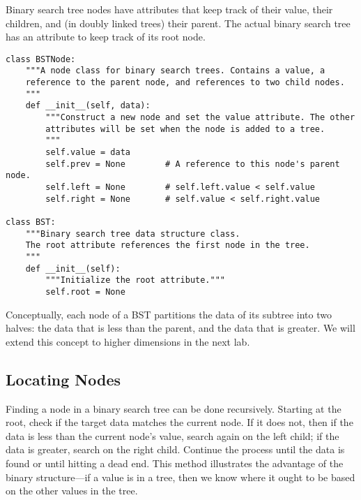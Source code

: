 Binary search tree nodes have attributes that keep track of their value, their children, and (in doubly linked trees) their parent.
The actual binary search tree has an attribute to keep track of its root node.

\begin{lstlisting}
class BSTNode:
    """A node class for binary search trees. Contains a value, a
    reference to the parent node, and references to two child nodes.
    """
    def __init__(self, data):
        """Construct a new node and set the value attribute. The other
        attributes will be set when the node is added to a tree.
        """
        self.value = data
        self.prev = None        # A reference to this node's parent node.
        self.left = None        # self.left.value < self.value
        self.right = None       # self.value < self.right.value

class BST:
    """Binary search tree data structure class.
    The root attribute references the first node in the tree.
    """
    def __init__(self):
        """Initialize the root attribute."""
        self.root = None
\end{lstlisting}

\begin{info}
Conceptually, each node of a BST partitions the data of its subtree into two halves: the data that is less than the parent, and the data that is greater.
We will extend this concept to higher dimensions in the next lab.
\end{info}

\subsection*{Locating Nodes} %

Finding a node in a binary search tree can be done recursively.
Starting at the root, check if the target data matches the current node.
If it does not, then if the data is less than the current node's value, search again on the left child; if the data is greater, search on the right child.
Continue the process until the data is found or until hitting a dead end.
This method illustrates the advantage of the binary structure---if a value is in a tree, then we know where it ought to be based on the other values in the tree.

